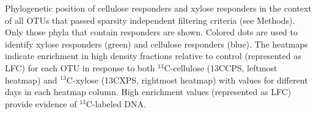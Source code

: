 Phylogenetic position of cellulose responders and xylose responders in the
context of all OTUs that passed sparsity independent filtering criteria (see
Methods). Only those phyla that contain responders are shown.  Colored dots are
used to identify xylose responders (green) and cellulose responders (blue). The
heatmaps indicate enrichment in high density fractions relative to control
(represented as LFC) for each OTU in response to both $^{13}$C-cellulose
(13CCPS, leftmost heatmap) and $^{13}$C-xylose (13CXPS, rightmost heatmap) with
values for different days in each heatmap column. High enrichment values
(represented as LFC) provide evidence of $^{13}$C-labeled DNA.  

